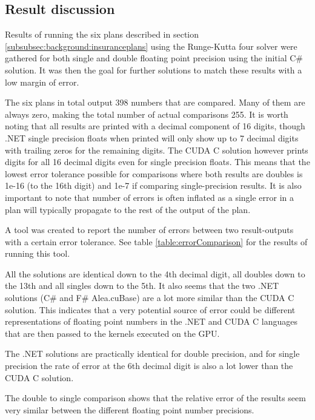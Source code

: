 \subsection{Result discussion}\label{subsec:result_comparison}
Results of running the six plans described in section \ref{subsubsec:background:insuranceplans} using the Runge-Kutta four solver were gathered for both single and double floating point precision using the initial C\# solution.
It was then the goal for further solutions to match these results with a low margin of error.

The six plans in total output 398 numbers that are compared. 
Many of them are always zero, making the total number of actual comparisons 255.
It is worth noting that all results are printed with a decimal component of 16 digits, though .NET single precision floats when printed will only show up to 7 decimal digits with trailing zeros for the remaining digits.
The CUDA C solution however prints digits for all 16 decimal digits even for single precision floats.
This means that the lowest error tolerance possible for comparisons where both results are doubles is 1e-16 (to the 16th digit) and 1e-7 if comparing single-precision results.
It is also important to note that number of errors is often inflated as a single error in a plan will typically propagate to the rest of the output of the plan.

A tool was created to report the number of errors between two result-outputs with a certain error tolerance.
See table \ref{table:errorComparison} for the results of running this tool.

All the solutions are identical down to the 4th decimal digit, all doubles down to the 13th and all singles down to the 5th.
It also seems that the two .NET solutions (C\# and F\# Alea.cuBase) are a lot more similar than the CUDA C solution.
This indicates that a very potential source of error could be different representations of floating point numbers in the .NET and CUDA C languages that are then passed to the kernels executed on the GPU.

The .NET solutions are practically identical for double precision, and for single precision the rate of error at the 6th decimal digit is also a lot lower than the CUDA C solution.

The double to single comparison shows that the relative error of the results seem very similar between the different floating point number precisions.


